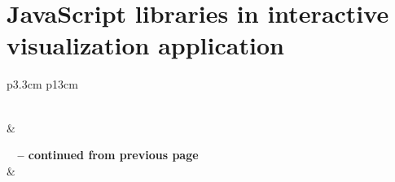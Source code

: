 
\chapter{JavaScript libraries in interactive visualization application}
\label{appendix:javascript_dependencies}

\begin{center}
\begin{longtable}{p{3.3cm} p{13cm}}
\caption[JavaScript dependencies]{JavaScript libraries} \label{tab:javascript_dependencies} \\

\hline {} &  \\ \hline 
\endfirsthead

%
{{\bfseries \tablename\ \thetable{} -- continued from previous page}} \\
\hline {} &  \\ \hline 
\endhead

\hline {} \\ \hline
\endfoot

\hline \hline
\endlastfoot


\end{longtable}
\end{center}
